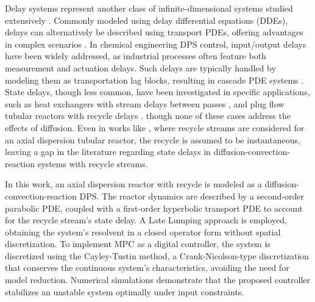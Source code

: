 Delay systems represent another class of infinite-dimensional systems studied extensively \cite{curtainbook}. Commonly modeled using delay differential equations (DDEs), delays can alternatively be described using transport PDEs, offering advantages in complex scenarios \cite{krstic2009book}. In chemical engineering DPS control, input/output delays have been widely addressed, as industrial processes often feature both measurement and actuation delays. Such delays are typically handled by modeling them as transportation lag blocks, resulting in cascade PDE systems \cite{Hiratsuka1969IEEE, mohammadi2012lq, Guilherme2019ACC}. State delays, though less common, have been investigated in specific applications, such as heat exchangers with stream delays between passes \cite{ozorio2019heat}, and plug flow tubular reactors with recycle delays \cite{qi2021output}. though none of these cases address the effects of diffusion. Even in works like \cite{khatibi2021model}, where recycle streams are considered for an axial dispersion tubular reactor, the recycle is assumed to be instantaneous, leaving a gap in the literature regarding state delays in diffusion-convection-reaction systems with recycle streams.

In this work, an axial dispersion reactor with recycle is modeled as a diffusion-convection-reaction DPS. The reactor dynamics are described by a second-order parabolic PDE, coupled with a first-order hyperbolic transport PDE to account for the recycle stream’s state delay. A Late Lumping approach is employed, obtaining the system’s resolvent in a closed operator form without spatial discretization. To implement MPC as a digital controller, the system is discretized using the Cayley-Tustin method, a Crank-Nicolson-type discretization that conserves the continuous system’s characteristics, avoiding the need for model reduction. Numerical simulations demonstrate that the proposed controller stabilizes an unstable system optimally under input constraints.